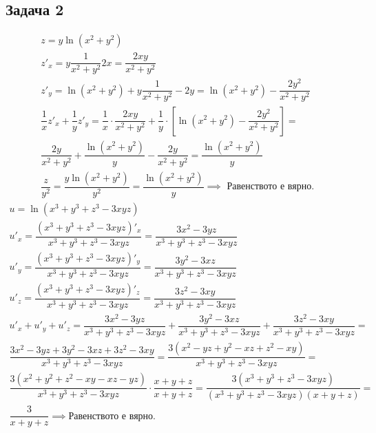 \documentclass[a4paper,fleqn,12pt]{article}
\theoremstyle{definition}
\begin{document}
\subsection*{Задача 2}
\begin{gather*}
z = y\ln{(x^2+y^2)} \\
z'_x = y\dfrac{1}{x^2 + y^2} 2x = \dfrac{2xy}{x^2 + y^2}\\
z'_y = \ln{(x^2+y^2)} + y\dfrac{1}{x^2 + y^2} -2y = \ln{(x^2+y^2)} - \dfrac{2y^2}{x^2 + y^2}\\ 
\dfrac{1}{x} z'_x + \dfrac{1}{y} z'_y = \dfrac{1}{x} \cdot \dfrac{2xy}{x^2 + y^2}  + \dfrac{1}{y} \cdot \left[\ln{(x^2+y^2)} - \dfrac{2y^2}{x^2 + y^2}\right] =\\
\dfrac{2y}{x^2 + y^2} + \dfrac{\ln{(x^2+y^2)}}{y} - \dfrac{2y}{x^2 + y^2} =   \dfrac{\ln{(x^2+y^2)}}{y} \\
\dfrac{z}{y^2} = \dfrac{y\ln{(x^2+y^2)}}{y^2} = \dfrac{\ln{(x^2+y^2)}}{y} \implies \text{ Равенството е вярно. }
\end{gather*}
\begin{gather*}
u = \ln{(x^3+y^3 + z^3 - 3xyz)} \\
u'_x = \dfrac{(x^3+y^3 + z^3 - 3xyz)'_x}{x^3+y^3 + z^3 - 3xyz} =  \dfrac{3x^2 - 3yz}{x^3+y^3 + z^3 - 3xyz}\\
u'_y = \dfrac{(x^3+y^3 + z^3 - 3xyz)'_y}{x^3+y^3 + z^3 - 3xyz} =  \dfrac{3y^2 - 3xz}{x^3+y^3 + z^3 - 3xyz}\\
u'_z = \dfrac{(x^3+y^3 + z^3 - 3xyz)'_z}{x^3+y^3 + z^3 - 3xyz} =  \dfrac{3z^2 - 3xy}{x^3+y^3 + z^3 - 3xyz}\\
u'_x + u'_y + u'_z  = \dfrac{3x^2 - 3yz}{x^3+y^3 + z^3 - 3xyz} + \dfrac{3y^2 - 3xz}{x^3+y^3 + z^3 - 3xyz} + \dfrac{3z^2 - 3xy}{x^3+y^3 + z^3 - 3xyz} =\\
\dfrac{3x^2 - 3yz + 3y^2 - 3xz + 3z^2 - 3xy}{x^3+y^3 + z^3 - 3xyz} = \dfrac{3(x^2 - yz + y^2 - xz + z^2 - xy)}{x^3+y^3 + z^3 - 3xyz} =\\
\dfrac{3(x^2 + y^2 + z^2 -xy -xz -yz)}{x^3+y^3 + z^3 - 3xyz} \cdot \dfrac{x+y+z}{x+y+z} = \dfrac{3(x^3+y^3 + z^3 - 3xyz)}{(x^3+y^3 + z^3 - 3xyz)(x+y+z)} =\\
\dfrac{3}{x+y+z} \implies \text{Равенството е вярно.}
\end{gather*}
\end{document}
